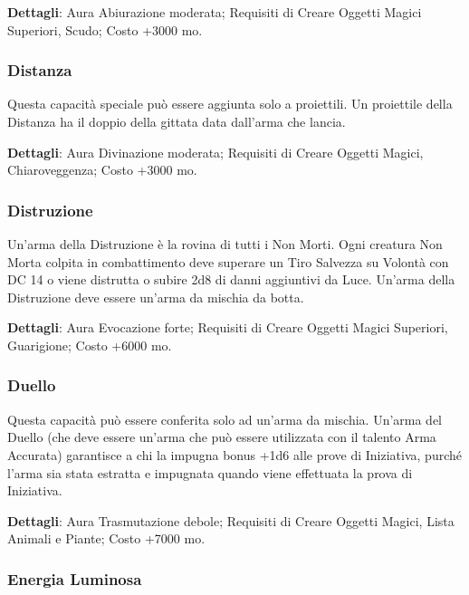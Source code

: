 \begin{multicols}{2}
\textbf{Dettagli}: Aura Abiurazione moderata; Requisiti di Creare Oggetti Magici Superiori, Scudo; Costo +3000 mo.

\subsubsection*{Distanza}

Questa capacità speciale può essere aggiunta solo a proiettili. Un proiettile della Distanza ha il doppio della gittata data dall'arma che lancia.

\textbf{Dettagli}: Aura Divinazione moderata; Requisiti di Creare Oggetti Magici, Chiaroveggenza; Costo +3000 mo.

\subsubsection*{Distruzione}

Un'arma della Distruzione è la rovina di tutti i Non Morti. Ogni creatura Non Morta colpita in combattimento deve superare un Tiro Salvezza su Volontà con DC 14 o viene distrutta o subire 2d8 di danni aggiuntivi da Luce. Un'arma della Distruzione deve essere un'arma da mischia da botta.

\textbf{Dettagli}: Aura Evocazione forte; Requisiti di Creare Oggetti Magici Superiori, Guarigione; Costo +6000 mo.

\subsubsection*{Duello}

Questa capacità può essere conferita solo ad un'arma da mischia. Un'arma del Duello (che deve essere un'arma che può essere utilizzata con il talento Arma Accurata) garantisce a chi la impugna bonus +1d6 alle prove di Iniziativa, purché l'arma sia stata estratta e impugnata quando viene effettuata la prova di Iniziativa.

\textbf{Dettagli}: Aura Trasmutazione debole; Requisiti di Creare Oggetti Magici, Lista Animali e Piante; Costo +7000 mo.

\subsubsection*{Energia Luminosa}


\end{multicols}
